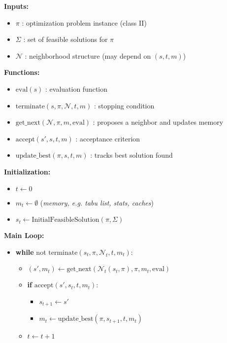 \begin{tcolorbox}[colback=white, colframe=black!25, title={\textbf{Procedure:} LocalSearch\_SearchByIterativeSolutionModification($\pi$)}]

\textbf{Inputs:}
\begin{itemize}[noitemsep, leftmargin=2em]
    \item $\pi$ : optimization problem instance (class II)
    \item $\Sigma$ : set of feasible solutions for $\pi$
    \item $\mathcal{N}$ : neighborhood structure (may depend on $(s, t, m)$)
\end{itemize}

\textbf{Functions:}
\begin{itemize}[noitemsep, leftmargin=2em]
    \item $\text{eval}(s)$ : evaluation function
    \item $\text{terminate}(s, \pi, \mathcal{N}, t, m)$ : stopping condition
    \item $\text{get\_next}(\mathcal{N}, \pi, m, \text{eval})$ : proposes a neighbor and updates memory
    \item $\text{accept}(s', s, t, m)$ : acceptance criterion
    \item $\text{update\_best}(\pi, s, t, m)$ : tracks best solution found
\end{itemize}

\vspace{0.7em}
\textbf{Initialization:}
\begin{itemize}[noitemsep, leftmargin=2em]
    \item $t \gets 0$
    \item $m_t \gets \emptyset$ \hfill (\textit{memory, e.g. tabu list, stats, caches})
    \item $s_t \gets \text{InitialFeasibleSolution}(\pi, \Sigma)$
\end{itemize}

\vspace{0.7em}
\textbf{Main Loop:}
\begin{itemize}[noitemsep, leftmargin=2em]
    \item \textbf{while} not $\text{terminate}(s_t, \pi, \mathcal{N}_t, t, m_t)$:
    \begin{itemize}[noitemsep, leftmargin=2em]
        \item $(s', m_t) \gets \text{get\_next}(\mathcal{N}_t(s_t, \pi), \pi, m_t, \text{eval})$
        \item \textbf{if} $\text{accept}(s', s_t, t, m_t)$:
        \begin{itemize}[noitemsep, leftmargin=2em]
            \item $s_{t+1} \gets s'$
            \item $m_t \gets \text{update\_best}(\pi, s_{t+1}, t, m_t)$
        \end{itemize}
        \item $t \gets t + 1$
    \end{itemize}
\end{itemize}


\end{tcolorbox}
